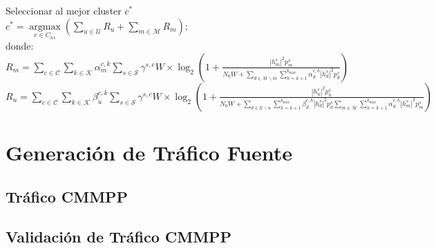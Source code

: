 \begin{algorithm}
\begin{algorithmic}[1]
        \State Seleccionar al mejor cluster $c^{*}$\\
        \State ${c^{*}} = \mathop {\arg \max }\limits _{c \in {C_{ns}}} \left ({{\sum \nolimits _{u \in \mathcal {U}} {R_{u} + \sum \nolimits _{m \in \mathcal {M}} {R_{m}} } } }\right) ;$ \\
        \State donde:\\
        \State ${R_{m}}=\sum \limits _{c \in \mathcal {C}} {\sum \limits _{k \in \mathcal {K}} {\alpha _{m}^{c,k}\sum \limits _{s \in \mathcal {S}} {{\gamma ^{s,c}}W} } } \times {\log _{2}}\left ({{1 + \frac {{{{\left |{ {h_{m}^{s}} }\right |}^{2}}p_{m}^{s}}}{{N_{0}W + \sum \limits _{d \in \mathcal {M}\backslash m} {\sum \limits _{h = k + 1}^{{k_{\max }}} {\alpha _{d}^{c,h}{{\left |{ {h_{d}^{s}} }\right |}^{2}}p_{d}^{s}} } }}} }\right)$\\
        
        \State ${R_{u}}=\sum \limits _{c \in \mathcal {C}} {\sum \limits _{k \in \mathcal {K}} {\beta _{u}^{c,k}\sum \limits _{s \in \mathcal {S}} {{\gamma ^{s,c}}W} } } \times {\log _{2}}\left ({{1 + \frac {{{{\left |{ {h_{u}^{s}} }\right |}^{2}}p_{u}^{s}}}{{N_{0}W + \sum \limits _{d \in \mathcal {U}\backslash u} {\sum \limits _{h = k + 1}^{{k_{\max }}} {\beta _{d}^{c,h}{{\left |{ {h_{d}^{s}} }\right |}^{2}}p_{d}^{s}}} \sum \limits _{m \in \mathcal {M}} {\sum \limits _{h = k + 1}^{{k_{\max }}} {\alpha _{d}^{c,h}{{\left |{ {h_{m}^{s}} }\right |}^{2}}p_{m}^{s}} } }}} }\right)$\\

    \EndFor
    
    \EndProcedure
    
    \end{algorithmic}
\end{algorithm}


\section{Generación de Tráfico Fuente}

\subsection{Tráfico CMMPP}
\subsection{Validación de Tráfico CMMPP}

